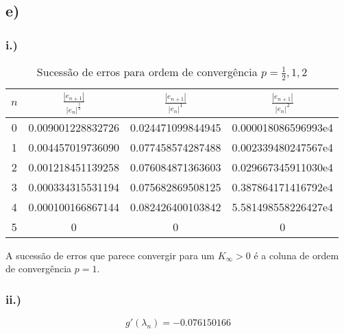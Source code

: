 \documentclass[a4paper, 18pt]{article}
\begin{document}
\subsection*{e)}
	\subsubsection*{i.)}

	
	\begin{table}[H]
		\setlength{\tabcolsep}{0.5cm} %
		\renewcommand{\arraystretch}{1.5} %
		\centering
		\caption{Sucessão de erros para ordem de convergência $p = \frac{1}{2}, 1, 2$}
		\label{2e_table}
		\begin{tabular}{c|c|c|c}
			$n$ & $\frac{|e_{n+1}|}{|e_n|^{\frac{1}{2}}}$ &  $\frac{|e_{n+1}|}{|e_n|^1}$ & $\frac{|e_{n+1}|}{|e_n|^{2}}$ \\\hline
			0 & 0.009001228832726 & 0.024471099844945 & 0.000018086596993e4 \\
			1 & 0.004457019736090 & 0.077458574287488 & 0.002339480247567e4 \\
			2 & 0.001218451139258 & 0.076084871363603 & 0.029667345911030e4 \\
			3 & 0.000334315531194 & 0.075682869508125 & 0.387864171416792e4 \\
			4 & 0.000100166867144 & 0.082426400103842 & 5.581498558226427e4 \\
			5 & 0                   & 0                 & 0 \\
		\end{tabular}
	\end{table}

	\par
	A sucessão de erros que parece convergir para um $K_\infty > 0$ é a coluna de ordem de convergência $p = 1$.


\subsubsection*{ii.)}
	$$g'(\lambda_n) = -0.076150166$$
\end{document}
